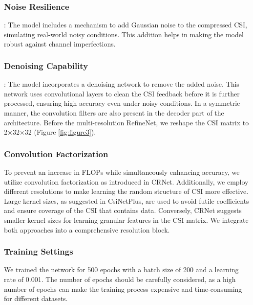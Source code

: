 \documentclass[lettersize,journal]{IEEEtran}
\begin{document}
\subsubsection{Noise Resilience}:
The model includes a mechanism to add Gaussian noise to the compressed CSI, simulating real-world noisy conditions. This addition helps in making the model robust against channel imperfections. 

\subsubsection{Denoising Capability}:
The model incorporates a denoising network to remove the added noise. This network uses convolutional layers to clean the CSI feedback before it is further processed, ensuring high accuracy even under noisy conditions. In a symmetric manner, the convolution filters are also present in the decoder part of the architecture. Before the multi-resolution RefineNet, we reshape the CSI matrix to 2×32×32 (Figure \ref{fig:figure3}).

\subsubsection{Convolution Factorization} To prevent an increase in FLOPs while simultaneously enhancing accuracy, we utilize convolution factorization as introduced in CRNet\cite{abn}. Additionally, we employ different resolutions to make learning the random structure of CSI more effective. Large kernel sizes, as suggested in CsiNetPlus\cite{abo}, are used to avoid futile coefficients and ensure coverage of the CSI that contains data. Conversely, CRNet\cite{abn} suggests smaller kernel sizes for learning granular features in the CSI matrix. We integrate both approaches into a comprehensive resolution block.

\subsubsection{Training Settings}
We trained the network for 500 epochs with a batch size of 200 and a learning rate of 0.001. The number of epochs should be carefully considered, as a high number of epochs can make the training process expensive and time-consuming for different datasets.
\end{document}
